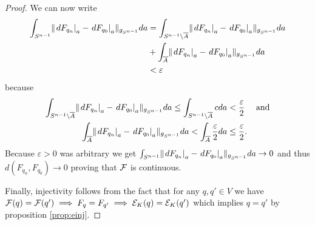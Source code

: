 \begin{proof}
We can now write 
\begin{align*}
    \int_{S^{n-1}} \lVert \left.dF_{q_n}\right\rvert_a - \left.dF_{q_0}\right\rvert_a \rVert_{g_{S^{n-1}}}da &= \int_{{S^{n-1}}\setminus{\overline{A}}}\lVert \left.dF_{q_n}\right\rvert_a - \left.dF_{q_0}\right\rvert_a \rVert_{g_{S^{n-1}}}da\\ &+ \int_{{\overline{A}}}\lVert \left.dF_{q_n}\right\rvert_a - \left.dF_{q_0}\right\rvert_a \rVert_{g_{S^{n-1}}}da\\
    &<\varepsilon
\end{align*} because 
\begin{align*}
    \int_{{S^{n-1}}\setminus{\overline{A}}}\lVert \left.dF_{q_n}\right\rvert_a - \left.dF_{q_0}\right\rvert_a \rVert_{g_{S^{n-1}}}da \leq \int_{{S^{n-1}} \setminus {\overline{A}}}cda &< \frac{\varepsilon}{2} \quad \text{ and}\\
    \int_{{\overline{A}}}\lVert \left.dF_{q_n}\right\rvert_a - \left.dF_{q_0}\right\rvert_a \rVert_{g_{S^{n-1}}}da < \int_{{\overline{A}}}\frac{\varepsilon}{2}da &\leq \frac{\varepsilon}{2}.
\end{align*}
Because $\varepsilon>0$ was arbitrary we get $\int_{{S^{n-1}}} \lVert \left.dF_{q_n}\right\rvert_a - \left.dF_{q_0}\right\rvert_a \rVert_{g_{S^{n-1}}}da \to 0$ and thus $d(F_{q_n},F_{q_0})\to 0$ proving that $\mathcal{F}$ is continuous.

Finally, injectivity follows from the fact that for any $q,q'\in V$ we have $\mathcal{F}(q)=\mathcal{F}(q')\implies F_q = F_{q'} \implies {{\mathcal{E}}_K}(q) = {{\mathcal{E}}_K}(q')$ which implies $q = q'$ by proposition \ref{prop:einj}.
\end{proof}

